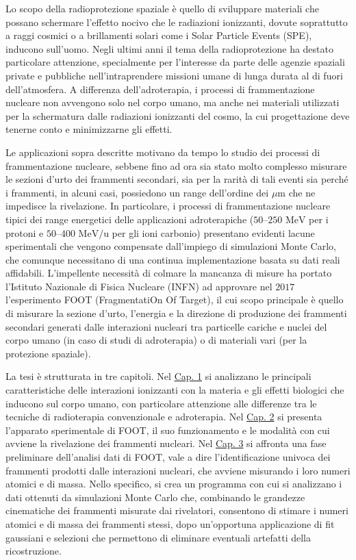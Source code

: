 \documentclass[12pt,a4paper,twoside]{report}
\begin{document}
	Lo scopo della radioprotezione spaziale è quello di sviluppare materiali che possano schermare l'effetto nocivo che le radiazioni ionizzanti, dovute soprattutto a raggi cosmici o a brillamenti solari come i Solar Particle Events (SPE), inducono sull'uomo. Negli ultimi anni il tema della radioprotezione ha destato particolare attenzione, specialmente per l'interesse da parte delle agenzie spaziali private e pubbliche nell'intraprendere missioni umane di lunga durata al di fuori dell'atmosfera. A differenza dell'adroterapia, i processi di frammentazione nucleare non avvengono solo nel corpo umano, ma anche nei materiali utilizzati per la schermatura dalle radiazioni ionizzanti del cosmo, la cui progettazione deve tenerne conto e minimizzarne gli effetti.
	
	Le applicazioni sopra descritte motivano da tempo lo studio dei processi di frammentazione nucleare, sebbene fino ad ora sia stato molto complesso misurare le sezioni d'urto dei frammenti secondari, sia per la rarità di tali eventi sia perché i frammenti, in alcuni casi, possiedono un range dell'ordine dei $\mu\mbox{m}$ che ne impedisce la rivelazione. In particolare, i processi di frammentazione nucleare tipici dei range energetici delle applicazioni adroterapiche ($50$--$250\mbox{ MeV}$ per i protoni e $50$--$400\mbox{ MeV/u}$ per gli ioni carbonio) presentano evidenti lacune sperimentali che vengono compensate dall'impiego di simulazioni Monte Carlo, che comunque necessitano di una continua implementazione basata su dati reali affidabili. L'impellente necessità di colmare la mancanza di misure ha portato l'Istituto Nazionale di Fisica Nucleare (INFN) ad approvare nel $2017$ l'esperimento FOOT (FragmentatiOn Of Target), il cui scopo principale è quello di misurare la sezione d'urto, l'energia e la direzione di produzione dei frammenti secondari generati dalle interazioni nucleari tra particelle cariche e nuclei del corpo umano (in caso di studi di adroterapia) o di materiali vari (per la protezione spaziale).
	
	La tesi è strutturata in tre capitoli. Nel \hyperref[cap:1]{Cap. 1} si analizzano le principali caratteristiche delle interazioni ionizzanti con la materia e gli effetti biologici che inducono sul corpo umano, con particolare attenzione alle differenze tra le tecniche di radioterapia convenzionale e adroterapia. Nel \hyperref[cap:2]{Cap. 2} si presenta l'apparato sperimentale di FOOT, il suo funzionamento e le modalità con cui avviene la rivelazione dei frammenti nucleari. Nel \hyperref[cap:3]{Cap. 3} si affronta una fase preliminare dell'analisi dati di FOOT, vale a dire l'identificazione univoca dei frammenti prodotti dalle interazioni nucleari, che avviene misurando i loro numeri atomici e di massa. Nello specifico, si crea un programma con cui si analizzano i dati ottenuti da simulazioni Monte Carlo che, combinando le grandezze cinematiche dei frammenti misurate dai rivelatori, consentono di stimare i numeri atomici e di massa dei frammenti stessi, dopo un'opportuna applicazione di fit gaussiani e selezioni che permettono di eliminare eventuali artefatti della ricostruzione.
	\newpage
\end{document}
